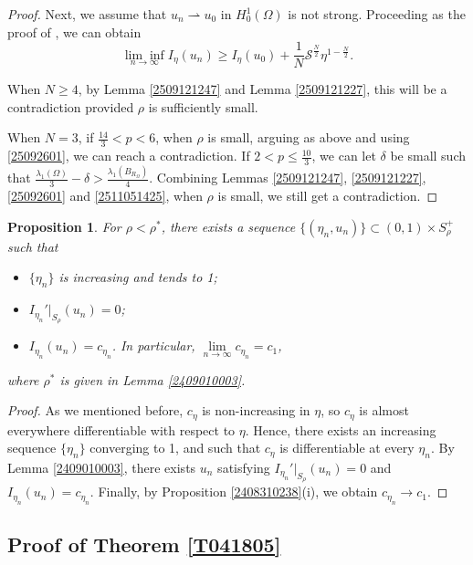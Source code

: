 \documentclass[10pt]{article}
\numberwithin{equation}{section}
\newtheorem{proposition}[theorem]{Proposition}
\numberwithin{equation}{section}
\begin{document}
\begin{proof}
Next, we assume that ${u}_n\rightharpoonup u_0$ in $H^1_0(\Omega)$ is not strong. Proceeding as the proof of \cite[Corollary 2.5]{Pierotti25}, we can obtain
\begin{equation}\label{2511051425}
\underset{n\to\infty}{\lim\inf}I_\eta(u_n)\ge I_\eta(u_0)+\frac{1}{N}{\mathcal{S}}^{\frac{N}{2}}\eta^{1-\frac{N}{2}}.
\end{equation}

When $N\ge 4$, by Lemma \ref{2509121247} and Lemma \ref{2509121227},  this will be a contradiction provided $\rho$ is sufficiently small. 

When $N=3$, if $\frac{14}{3}< p<6$, when $\rho$ is small, arguing as above and using \eqref{25092601}, we can reach a contradiction. If $2< p\le \frac{10}{3}$, we can let $\delta$ be small such that $\frac{\lambda_1(\Omega)}{3}-\delta>\frac{\lambda_1(B_{R_\Omega})}{4}$. Combining Lemmas \ref{2509121247}, \ref{2509121227}, \eqref{25092601} and \eqref{2511051425}, when $\rho$ is small, we still get a contradiction.
\end{proof}
\begin{proposition}\label{2408302031}
For $\rho<\rho^*$, there exists a sequence $\{(\eta_n, u_n)\}\subset (0, 1)\times S_\rho^+$ such that
\begin{itemize}
\item[\rm (i)] $\{\eta_n\}$ is increasing and tends to 1;
\item[\rm (ii)] $I_{\eta_n}'|_{S_\rho}(u_n)=0$;
\item[\rm (iii)] $I_{\eta_n}(u_n)=c_{\eta_n}$. In particular, $\lim\limits_{n\to\infty}{c}_{\eta_n}=c_{1}$,
\end{itemize}
where $\rho^*$ is given in Lemma \ref{2409010003}.
\end{proposition}
\begin{proof}
As we mentioned before, $c_{\eta}$ is non-increasing in $\eta$, so $c_{\eta}$ is almost everywhere differentiable with respect to $\eta$. Hence, there exists an increasing sequence $\{\eta_n\}$ converging to 1, and such that $c_\eta$ is differentiable at every $\eta_n$. By Lemma \ref{2409010003}, there exists  $u_n$ satisfying $I_{\eta_n}'|_{S_\rho}(u_n)=0$ and $I_{\eta_n}(u_n)=c_{\eta_n}$. Finally, by Proposition \ref{2408310238}(i), we obtain $c_{\eta_n}\to c_1$.
\end{proof}


\subsection{Proof of Theorem \ref{T041805}}
\end{document}
